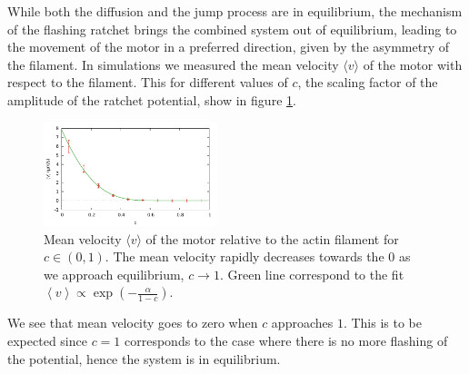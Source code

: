 \documentclass[aps,pre,twocolumn,showpacs,showkeys,a4paper]{revtex4}
\begin{document}
While both the diffusion and the jump process are in equilibrium, the mechanism of the flashing ratchet brings the combined system out of equilibrium, leading to the movement of the motor in a preferred direction, given by the asymmetry of the filament. 
In simulations we measured the mean velocity $\langle v\rangle$ of the motor with respect to the filament. 
This for different values of $c$, the scaling factor of the amplitude of the ratchet potential, show in figure \ref{Fig: c_v}.
\begin{figure}[b]
\centering
\includegraphics[width=0.45\textwidth,height=!]{c_v_4heads}
\caption{Mean velocity $\langle v \rangle$ of the motor relative to the actin filament for $c \in (0,1)$.
The mean velocity rapidly decreases towards the $0$ as we approach equilibrium, $c \to 1$.  
Green line correspond to the fit $ \left\langle v \right\rangle \propto \exp ( - \frac{\alpha}{1-c} ) $.
} 
\label{Fig: c_v}
\end{figure}
We see that mean velocity goes to zero when $c$ approaches $1$. 
This is to be expected since $c=1$ corresponds to the case where there is no more flashing of the potential, hence the system is in equilibrium.
\end{document}
